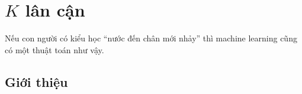 \chapter{$K$ lân cận}
\label{cha:knn}


Nếu con người có kiểu học ``nước đến chân mới nhảy'' thì machine
learning cũng có một thuật toán như vậy.


\section{Giới thiệu}







